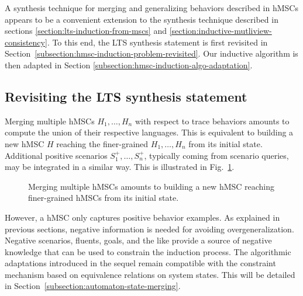 A synthesis technique for merging and generalizing behaviors described in hMSCs appears to be a convenient extension to the synthesis technique described in sections \ref{section:lts-induction-from-mscs} and \ref{section:inductive-mutliview-consistency}. To this end, the LTS synthesis statement is first revisited in Section~\ref{subsection:hmsc-induction-problem-revisited}. Our inductive algorithm is then adapted in Section \ref{subsection:hmsc-induction-algo-adaptation}.

\subsection{Revisiting the LTS synthesis statement\label{subsection:hmsc-induction-problem-revisited}}

Merging multiple hMSCs $H_1,\ldots,H_n$ with respect to trace behaviors amounts to compute the union of their respective languages. This is equivalent to building a new hMSC $H$ reaching the finer-grained $H_1,\ldots,H_n$ from its initial state. Additional positive scenarios $S^+_1,\ldots,S^+_n$, typically coming from scenario queries, may be integrated in a similar way. This is illustrated in Fig.~\ref{figure:multiple-hmscs}.

\begin{figure}\centering
{}
\caption{Merging multiple hMSCs amounts to building a new hMSC reaching finer-grained hMSCs from its initial state.\label{figure:multiple-hmscs}} 
\end{figure}

However, a hMSC only captures positive behavior examples. As explained in previous sections, negative information is needed for avoiding overgeneralization. Negative scenarios, fluents, goals, and the like provide a source of negative knowledge that can be used to constrain the induction process. The algorithmic adaptations introduced in the sequel remain compatible with the constraint mechanism based on equivalence relations on system states. This will be detailed in Section~\ref{subsection:automaton-state-merging}.

